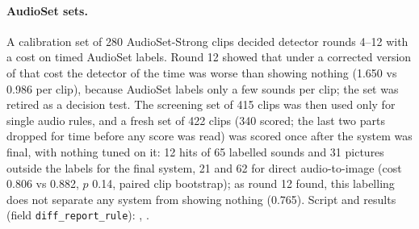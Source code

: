 \paragraph{AudioSet sets.} A calibration set of 280 AudioSet-Strong clips decided detector rounds 4--12 with a cost on
timed AudioSet labels. Round 12 showed that under a corrected version of that cost the detector of the time was worse
than showing nothing (1.650 vs 0.986 per clip), because AudioSet labels only a few sounds per clip; the set was retired
as a decision test. The screening set of 415 clips was then used only for single audio rules, and a fresh set of 422
clips (340 scored; the last two parts dropped for time before any score was read) was scored once after the system
was final, with nothing tuned on it: 12 hits of 65 labelled sounds and 31 pictures outside the labels for the final
system, 21 and 62 for direct audio-to-image (cost 0.806 vs 0.882, $p$ 0.14, paired clip bootstrap); as round 12 found,
this labelling does not separate any system from showing nothing (0.765). Script and results (field
\texttt{diff\_report\_rule}):
, .

